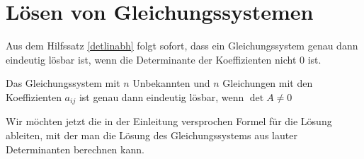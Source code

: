 %
%
%
\section{Lösen von Gleichungssystemen}
Aus dem Hilfssatz \ref{detlinabh} folgt sofort, dass ein Gleichungssystem
genau dann eindeutig lösbar ist, wenn die Determinante der Koeffizienten
nicht $0$ ist.

\begin{satz}
Das Gleichungssystem mit $n$ Unbekannten und $n$ Gleichungen
mit den Koeffizienten $a_{ij}$ ist genau dann eindeutig lösbar,
wenn
$\det A\ne 0$
\end{satz}

Wir möchten jetzt die in der Einleitung versprochen Formel für die Lösung
ableiten, mit der man die Lösung des Gleichungssystems aus lauter
Determinanten berechnen kann.

